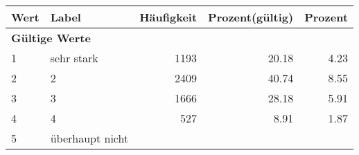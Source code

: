      \begin{longtable}{lXrrr}
     \toprule
     \textbf{Wert} & \textbf{Label} & \textbf{Häufigkeit} & \textbf{Prozent(gültig)} & \textbf{Prozent} \\
     \endhead
     \midrule
     \multicolumn{5}{l}{\textbf{Gültige Werte}}\\

     1 &
     \multicolumn{1}{X}{ sehr stark   } &


       \num{1193} &
       \num[round-mode=places,round-precision=2]{20,18} &
         \num[round-mode=places,round-precision=2]{4,23} \\

     2 &
     \multicolumn{1}{X}{ 2   } &


       \num{2409} &
       \num[round-mode=places,round-precision=2]{40,74} &
         \num[round-mode=places,round-precision=2]{8,55} \\

     3 &
     \multicolumn{1}{X}{ 3   } &


       \num{1666} &
       \num[round-mode=places,round-precision=2]{28,18} &
         \num[round-mode=places,round-precision=2]{5,91} \\

     4 &
     \multicolumn{1}{X}{ 4   } &


       \num{527} &
       \num[round-mode=places,round-precision=2]{8,91} &
         \num[round-mode=places,round-precision=2]{1,87} \\

     5 &
     \multicolumn{1}{X}{ überhaupt nicht   } &



\end{longtable}

